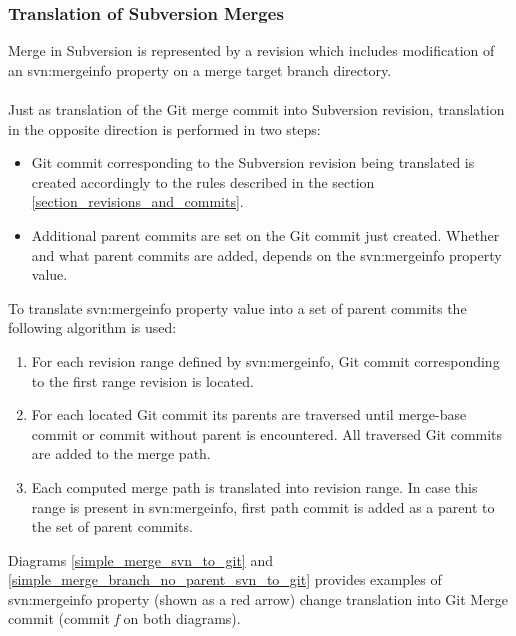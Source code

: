 \subsubsection{Translation of Subversion Merges}
\label{section_subversion_merge_to_git}
Merge in Subversion is represented by a revision which includes modification of an svn:mergeinfo property
on a merge target branch directory.
\\\\
Just as translation of the Git merge commit into Subversion revision, 
translation in the opposite direction is performed in two steps:
\begin{itemize}
\item Git commit corresponding to the Subversion revision being translated is created accordingly 
to the rules described in the section \ref{section_revisions_and_commits}.
\item Additional parent commits are set on the Git commit just created. 
Whether and what parent commits are added, depends on the svn:mergeinfo property value.
\end{itemize}
To translate svn:mergeinfo property value into a set of parent commits the following algorithm is used:
\begin{enumerate}
\item For each revision range defined by svn:mergeinfo, Git commit corresponding to the first range
revision is located.
\item For each located Git commit its parents are traversed until merge-base commit or commit without
parent is encountered. All traversed Git commits are added to the merge path.
\item Each computed merge path is translated into revision range. In case this range is present in 
svn:mergeinfo, first path commit is added as a parent to the set of parent commits.
\end{enumerate}
Diagrams \ref{simple_merge_svn_to_git} and \ref{simple_merge_branch_no_parent_svn_to_git} provides
examples of svn:mergeinfo property (shown as a red arrow) change translation into Git Merge commit (commit \emph{f} on both
diagrams).

